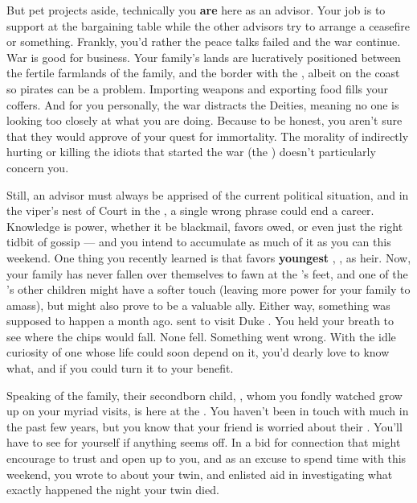 \documentclass[char]{GL2020}
\begin{document}
But pet projects aside, technically you \textbf{are} here as an advisor. Your job is to support \cEvil{} at the bargaining table while the other advisors try to arrange a ceasefire or something. Frankly, you’d rather the peace talks failed and the war continue. War is good for business. Your family’s lands are lucratively positioned between the fertile farmlands of the \cChupStudent{\formal} family, and the border with the \pTech{}, albeit on the coast so pirates can be a problem. Importing weapons and exporting food fills your coffers. And for you personally, the war distracts the Deities, meaning no one is looking too closely at what you are doing. Because to be honest, you aren’t sure that they would approve of your quest for immortality. The morality of indirectly hurting or killing the idiots that started the war (the \pShip{}) doesn’t particularly concern you.

Still, an advisor must always be apprised of the current political situation, and in the viper's nest of Court in the \pFarm{}, a single wrong phrase could end a career. Knowledge is power, whether it be blackmail, favors owed, or even just the right tidbit of gossip — and you intend to accumulate as much of it as you can this weekend. One thing you recently learned is that \cQueen{\Monarch} \cQueen{} favors \cQueen{\their} \textbf{youngest} \cPrince{\offspring}, \cPrince{}, as \cQueen{\their} heir. Now, your family has never fallen over themselves to fawn at the \cQueen{\Monarch}’s feet, and one of the \cQueen{\Monarch}’s other children might have a softer touch (leaving more power for your family to amass), but \cPrince{} might also prove to be a valuable ally. Either way, something was supposed to happen a month ago. \cQueen{\Monarch} \cQueen{} sent \cPrince{} to visit Duke \cChupStudent{\formal}. You held your breath to see where the chips would fall. None fell. Something went wrong. With the idle curiosity of one whose life could soon depend on it, you’d dearly love to know what, and if you could turn it to your benefit.

Speaking of the \cChupStudent{\formal} family, their secondborn child, \cChupStudent{}, whom you fondly watched grow up on your myriad visits, is here at the \pSchool{}. You haven’t been in touch with \cChupStudent{\them} much in the past few years, but you know that your friend is worried about their \cChupStudent{\offspring}. You’ll have to see for yourself if anything seems off. In a bid for connection that might encourage \cChupStudent{} to trust and open up to you, and as an excuse to spend time with \cChupStudent{\them} this weekend, you wrote to \cChupStudent{\them} about your twin, and enlisted \cChupStudent{\their} aid in investigating what exactly happened the night your twin died. 
\end{document}
